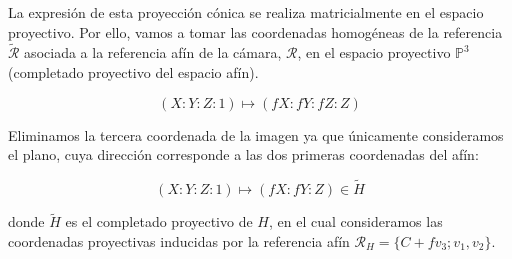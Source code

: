 \documentclass[
10pt, %
a4paper, %
oneside, %
headinclude,footinclude, %
BCOR=5mm, %
]{scrartcl}
\begin{document}
La expresión de esta proyección cónica se realiza matricialmente en el espacio proyectivo. Por ello, vamos a tomar las coordenadas homogéneas de la referencia $\tilde{\mathcal{R}}$ asociada a la referencia afín de la cámara, $\mathcal{R}$, en el espacio proyectivo $\mathbb{P}^3$ (completado proyectivo del espacio afín).

\[
    (X:Y:Z:1) \longmapsto (fX:fY:fZ:Z)
\]

Eliminamos la tercera coordenada de la imagen ya que únicamente consideramos el plano, cuya dirección corresponde a las dos primeras coordenadas del afín:

\[
    (X:Y:Z:1) \longmapsto (fX:fY:Z) \in \tilde{H}
\]

donde $\tilde{H}$ es el completado proyectivo de $H$, en el cual consideramos las coordenadas proyectivas inducidas por la referencia afín $\mathcal{R}_H = \{C + fv_3; v_1, v_2\}$.
\end{document}
